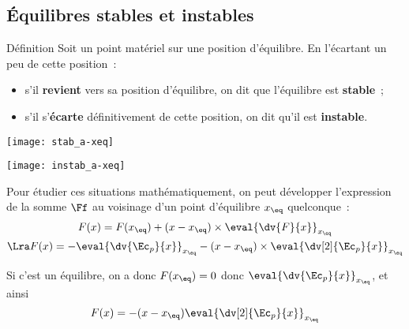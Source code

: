\documentclass[../main/main.tex]{subfiles}
\begin{document}
\subsection{Équilibres stables et instables}

\begin{tdefi}{Définition}
    Soit un point matériel sur une position d'équilibre. En l'écartant un peu de
    cette position~:
    \begin{itemize}
        \item s'il \textbf{revient} vers sa position d'équilibre, on dit que
            l'équilibre est \textbf{stable}~;
        \item s'il s'\textbf{écarte} définitivement de cette position, on dit
            qu'il est \textbf{instable}.
    \end{itemize}
    \begin{minipage}{0.45\linewidth}
        \begin{center}
            \texttt{[image: stab\_a-xeq]}
        \end{center}
    \end{minipage}
    \hfill
    \begin{minipage}{0.45\linewidth}
        \begin{center}
            \texttt{[image: instab\_a-xeq]}
        \end{center}
    \end{minipage}
\end{tdefi}

Pour étudier ces situations mathématiquement, on peut développer l'expression de
la somme $\Ff$ au voisinage d'un point d'équilibre $x_{\eq}$ quelconque~:
\begin{gather*}
    F(x) = F(x_{\eq}) + (x-x_{\eq})\times \eval{\dv{F}{x}}_{x_{\eq}}
    \\\Lra
    F(x) = - \eval{\dv{\Ec_p}{x}}_{x_{\eq}} -
        (x-x_{\eq})\times\eval{\dv[2]{\Ec_p}{x}}_{x_{\eq}}
\end{gather*}

Si c'est un équilibre, on a donc $F(x_{\eq}) = 0$ donc
$\eval{\dv{\Ec_p}{x}}_{x_{\eq}}$, et ainsi
\[F(x) = -(x-x_{\eq}) \eval{\dv[2]{\Ec_p}{x}}_{x_{\eq}}\]
\end{document}
